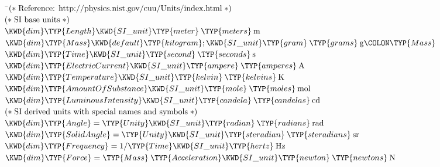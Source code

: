 \begin{Fortress}
{\tt~}\pushtabs\=\+\( \mathtt{(*}\;\hbox{\rm  Reference: http://physics.nist.gov/cuu/Units/index.html \unskip}\;\mathtt{*)}\)\\[4pt]
\( \mathtt{(*}\;\hbox{\rm  SI base units \unskip}\;\mathtt{*)}\)\\[4pt]
\( \KWD{dim} \TYP{Length}  \KWD{SI{\char'137}unit} \TYP{meter}\mskip 4mu plus 4mu\TYP{meters}\mskip 4mu plus 4mu\mathrm{m}\)\\
\( \KWD{dim} \TYP{Mass} \KWD{default} \TYP{kilogram}; \KWD{SI{\char'137}unit} \TYP{gram}\mskip 4mu plus 4mu\TYP{grams}\mskip 4mu plus 4mu\mathrm{g}\COLON \TYP{Mass}\)\\
\( \KWD{dim} \TYP{Time}  \KWD{SI{\char'137}unit} \TYP{second}\mskip 4mu plus 4mu\TYP{seconds}\mskip 4mu plus 4mu\mathrm{s}\)\\
\( \KWD{dim} \TYP{ElectricCurrent}  \KWD{SI{\char'137}unit} \TYP{ampere}\mskip 4mu plus 4mu\TYP{amperes}\mskip 4mu plus 4mu\mathrm{A}\)\\
\( \KWD{dim} \TYP{Temperature}  \KWD{SI{\char'137}unit} \TYP{kelvin}\mskip 4mu plus 4mu\TYP{kelvins}\mskip 4mu plus 4mu\mathrm{K}\)\\
\( \KWD{dim} \TYP{AmountOfSubstance}  \KWD{SI{\char'137}unit} \TYP{mole}\mskip 4mu plus 4mu\TYP{moles}\mskip 4mu plus 4mu\mathrm{mol}\)\\
\( \KWD{dim} \TYP{LuminousIntensity}  \KWD{SI{\char'137}unit} \TYP{candela}\mskip 4mu plus 4mu\TYP{candelas}\mskip 4mu plus 4mu\mathrm{cd}\)\\[4pt]
\( \mathtt{(*}\;\hbox{\rm  SI derived units with special names and symbols \unskip}\;\mathtt{*)}\)\\[4pt]
\( \KWD{dim} \TYP{Angle} = \TYP{Unity}  \KWD{SI{\char'137}unit} \TYP{radian}\mskip 4mu plus 4mu\TYP{radians}\mskip 4mu plus 4mu\mathrm{rad} \)\\
\( \KWD{dim} \TYP{SolidAngle} = \TYP{Unity}  \KWD{SI{\char'137}unit} \TYP{steradian}\mskip 4mu plus 4mu\TYP{steradians}\mskip 4mu plus 4mu\mathrm{sr} \)\\
\( \KWD{dim} \TYP{Frequency} = 1 / \TYP{Time}  \KWD{SI{\char'137}unit} \TYP{hertz}\mskip 4mu plus 4mu\mathrm{Hz} \)\\
\( \KWD{dim} \TYP{Force} = \TYP{Mass}\mskip 4mu plus 4mu\TYP{Acceleration}  \KWD{SI{\char'137}unit} \TYP{newton}\mskip 4mu plus 4mu\TYP{newtons}\mskip 4mu plus 4mu\mathrm{N} \)\\

\end{Fortress}
